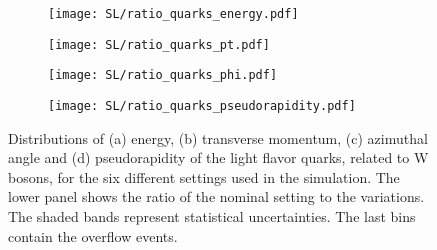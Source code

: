 \begin{figure}[H]
    \centering
    \begin{subfigure}{0.49\textwidth}
        \centering
        \texttt{[image: SL/ratio\_quarks\_energy.pdf]}
        \caption{}
        \label{app:subfig:E(quarks)_SL}
    \end{subfigure}
    \begin{subfigure}{0.49\textwidth}
        \centering
        \texttt{[image: SL/ratio\_quarks\_pt.pdf]}
        \caption{}
        \label{app:subfig:pt(quarks)_SL}
    \end{subfigure}

    \vspace{0.2cm}
    
    \begin{subfigure}{0.49\textwidth}
        \centering
        \texttt{[image: SL/ratio\_quarks\_phi.pdf]}
        \caption{}
        \label{app:subfig:phi(quarks)_SL}
    \end{subfigure}
    \begin{subfigure}{0.49\textwidth}
        \centering
        \texttt{[image: SL/ratio\_quarks\_pseudorapidity.pdf]}
        \caption{}
        \label{app:subfig:eta(quarks)_SL}
    \end{subfigure}
    \caption{Distributions of (a) energy, (b) transverse momentum,  (c) azimuthal angle and (d) pseudorapidity of the light flavor quarks, related to W bosons, for the six different settings used in the simulation. The lower panel shows the ratio of the nominal setting to the variations. The shaded bands represent statistical uncertainties. The last bins contain the overflow events.}
    \label{app:fig:quarks_SL}
\end{figure}

